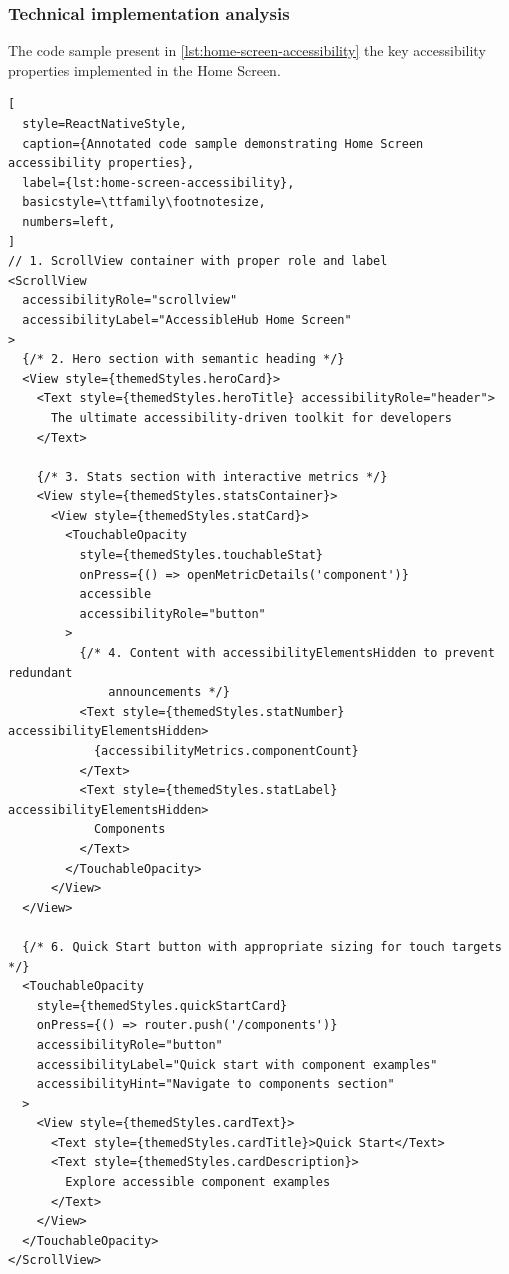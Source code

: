 \subsubsection{Technical implementation analysis}

The code sample present in \ref{lst:home-screen-accessibility} the key accessibility properties implemented in the Home Screen.

\begin{lstlisting}[
  style=ReactNativeStyle,
  caption={Annotated code sample demonstrating Home Screen accessibility properties},
  label={lst:home-screen-accessibility},
  basicstyle=\ttfamily\footnotesize,
  numbers=left,
]
// 1. ScrollView container with proper role and label
<ScrollView
  accessibilityRole="scrollview"
  accessibilityLabel="AccessibleHub Home Screen"
>
  {/* 2. Hero section with semantic heading */}
  <View style={themedStyles.heroCard}>
    <Text style={themedStyles.heroTitle} accessibilityRole="header">
      The ultimate accessibility-driven toolkit for developers
    </Text>

    {/* 3. Stats section with interactive metrics */}
    <View style={themedStyles.statsContainer}>
      <View style={themedStyles.statCard}>
        <TouchableOpacity
          style={themedStyles.touchableStat}
          onPress={() => openMetricDetails('component')}
          accessible
          accessibilityRole="button"
        >
          {/* 4. Content with accessibilityElementsHidden to prevent redundant 
              announcements */}
          <Text style={themedStyles.statNumber} accessibilityElementsHidden>
            {accessibilityMetrics.componentCount}
          </Text>
          <Text style={themedStyles.statLabel} accessibilityElementsHidden>
            Components
          </Text>
        </TouchableOpacity>
      </View>
  </View>

  {/* 6. Quick Start button with appropriate sizing for touch targets */}
  <TouchableOpacity
    style={themedStyles.quickStartCard}
    onPress={() => router.push('/components')}
    accessibilityRole="button"
    accessibilityLabel="Quick start with component examples"
    accessibilityHint="Navigate to components section"
  >
    <View style={themedStyles.cardText}>
      <Text style={themedStyles.cardTitle}>Quick Start</Text>
      <Text style={themedStyles.cardDescription}>
        Explore accessible component examples
      </Text>
    </View>
  </TouchableOpacity>
</ScrollView>
\end{lstlisting}

